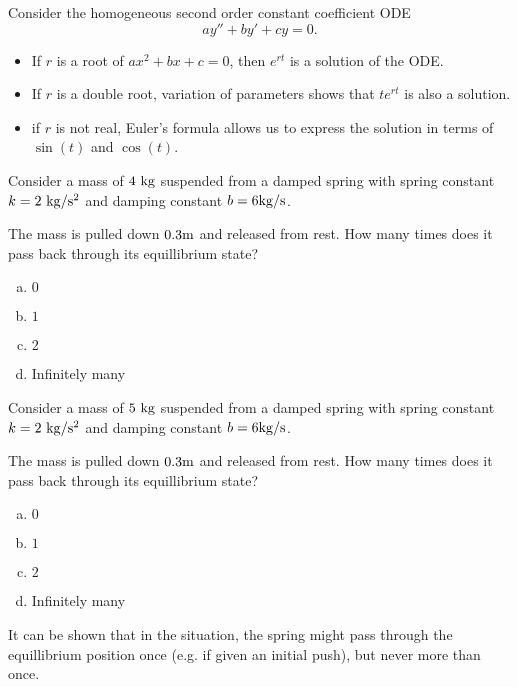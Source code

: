 
\begin{applicationActivities}

\begin{observation}
Consider the homogeneous second order constant coefficient ODE \[ay''+by'+cy=0.\]
\begin{itemize}
\item If \(r\) is a root of \(ax^2+bx+c=0\), then \(e^{rt}\) is a solution of the ODE.
\item If \(r\) is a double root, variation of parameters shows that \(te^{rt}\) is also a solution.
\item if \(r\) is not real, Euler's formula allows us to express the solution in terms of \(\sin(t)\) and \(\cos(t)\).
\end{itemize}
\end{observation}

\begin{activity}{15}
Consider a mass of \(4\ {\rm kg}\) suspended from a damped spring with spring constant \(k=2\ {\rm kg/s^2}\) and damping constant \(b= 6{\rm kg/s}\).  

The mass is pulled down \(0.3 {\rm m}\) and released from rest.  How many times does it pass back through its equillibrium state?
\begin{enumerate}[(a)]
\item \(0\)
\item \(1\)
\item \(2\)
\item Infinitely many
\end{enumerate}
\end{activity}

\begin{activity}{15}
Consider a mass of \(5\ {\rm kg}\) suspended from a damped spring with spring constant \(k=2\ {\rm kg/s^2}\) and damping constant \(b= 6{\rm kg/s}\).  

The mass is pulled down \(0.3 {\rm m}\) and released from rest.  How many times does it pass back through its equillibrium state?
\begin{enumerate}[(a)]
\item \(0\)
\item \(1\)
\item \(2\)
\item Infinitely many
\end{enumerate}
\end{activity}

\begin{observation}
It can be shown that in the  situation, the spring might pass through the equillibrium position once (e.g. if given an initial push), but never more than once.
\end{observation}


\end{applicationActivities}
